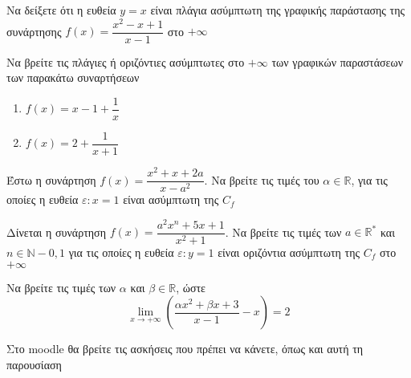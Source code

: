 \documentclass{presentation}
\begin{document}
\begin{askisi}
    Να δείξετε ότι η ευθεία $y=x$ είναι πλάγια ασύμπτωτη της γραφικής παράστασης της συνάρτησης $f(x)=\dfrac{x^2-x+1}{x-1}$ στο $+\infty$

\end{askisi}

\begin{askisi}
    Να βρείτε τις πλάγιες ή οριζόντιες ασύμπτωτες στο $+\infty$ των γραφικών παραστάσεων των παρακάτω συναρτήσεων
    \begin{enumerate}
        \item<1-> $f(x)=x-1+\dfrac{1}{x}$
        \item<2-> $f(x)=2+\dfrac{1}{x+1}$
    \end{enumerate}

\end{askisi}

\begin{askisi}
    Έστω η συνάρτηση $f(x)=\dfrac{x^2+x+2a}{x-a^2}$. Να βρείτε τις τιμές του $α\in\mathbb{R}$, για τις οποίες η ευθεία $ε:x=1$ είναι ασύμπτωτη της $C_f$

\end{askisi}

\begin{askisi}
    Δίνεται η συνάρτηση $f(x)=\dfrac{a^2x^n+5x+1}{x^2+1}$. Να βρείτε τις τιμές των $a\in\mathbb{R}^*$ και $n\in\mathbb{N}-{0,1}$ για τις οποίες η ευθεία $ε:y=1$ είναι οριζόντια ασύμπτωτη της $C_f$ στο $+\infty$

\end{askisi}

\begin{askisi}
    Να βρείτε τις τιμές των $α$ και $β\in\mathbb{R}$, ώστε
    $$\lim\limits_{x \to +\infty}{ \left(   \dfrac{αx^2+βx+3}{x-1}-x \right)}=2$$

\end{askisi}

\begin{frame}
    Στο moodle θα βρείτε τις ασκήσεις που πρέπει να κάνετε, όπως και αυτή τη παρουσίαση
\end{frame}


\appendix
\end{document}
